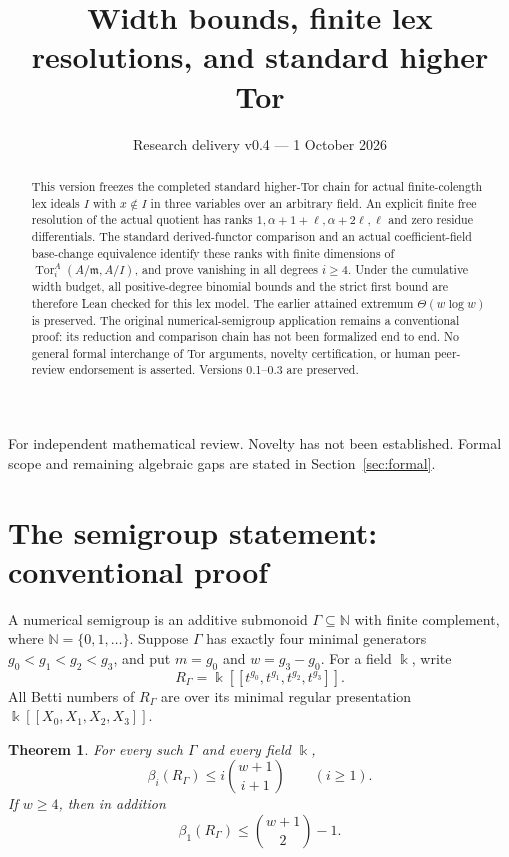 \documentclass[11pt,a4paper]{article}
\title{Width bounds, finite lex resolutions, and standard higher Tor}
\author{}
\date{Research delivery v0.4 --- 1 October 2026}
\newtheorem{theorem}{Theorem}[section]
\newcommand{\NN}{\mathbb N}
\newcommand{\kk}{\Bbbk}
\newcommand{\llbracket}{[\![}
\newcommand{\rrbracket}{]\!]}
\begin{document}
\maketitle
\vspace{-1.4em}
\begin{center}\small
For independent mathematical review. Novelty has not been established.
Formal scope and remaining algebraic gaps are stated in Section~\ref{sec:formal}.
\end{center}
\begin{abstract}
This version freezes the completed standard higher-Tor chain for actual
finite-colength lex ideals $I$ with $x\notin I$ in three variables over an arbitrary field.
An explicit finite free resolution of the actual quotient has ranks
$1,\alpha+1+\ell,\alpha+2\ell,\ell$ and zero residue differentials.
The standard derived-functor comparison and an actual coefficient-field
base-change equivalence identify these ranks with finite dimensions of
$\operatorname{Tor}_i^A(A/\mathfrak m,A/I)$, and prove vanishing in all degrees
$i\ge4$. Under the cumulative width budget, all positive-degree binomial
bounds and the strict first bound are therefore Lean checked for this lex
model. The earlier attained extremum $\Theta(w\log w)$ is preserved.
The original numerical-semigroup application remains a conventional proof:
its reduction and comparison chain has not been formalized end to end.
No general formal interchange of Tor arguments, novelty certification, or
human peer-review endorsement is asserted. Versions 0.1--0.3 are preserved.
\end{abstract}

\section{The semigroup statement: conventional proof}
A numerical semigroup is an additive submonoid $\Gamma\subseteq\NN$ with finite complement, where $\NN=\{0,1,\ldots\}$. Suppose $\Gamma$ has exactly four minimal generators $g_0<g_1<g_2<g_3$, and put $m=g_0$ and $w=g_3-g_0$. For a field $\kk$, write
\[
 R_\Gamma=\kk\llbracket t^{g_0},t^{g_1},t^{g_2},t^{g_3}\rrbracket.
\]
All Betti numbers of $R_\Gamma$ are over its minimal regular presentation $\kk\llbracket X_0,X_1,X_2,X_3\rrbracket$.

\begin{theorem}\label{thm:main}
For every such $\Gamma$ and every field $\kk$,
\[
 \beta_i(R_\Gamma)\le i\binom{w+1}{i+1}\qquad(i\ge1).
\]
If $w\ge4$, then in addition
\[
 \beta_1(R_\Gamma)\le\binom{w+1}{2}-1.
\]
\end{theorem}
\end{document}
